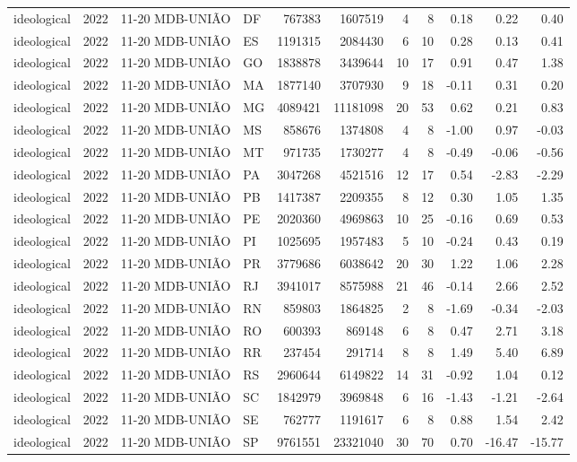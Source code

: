 \begin{landscape}
\begin{longtable}{lllL{1.4cm}rrrrrrr}
ideological & 2022 & 11-20 MDB-UNIÃO & DF & 767383 & 1607519 & 4 & 8 & 0.18 & 0.22 & 0.40 \\
ideological & 2022 & 11-20 MDB-UNIÃO & ES & 1191315 & 2084430 & 6 & 10 & 0.28 & 0.13 & 0.41 \\
ideological & 2022 & 11-20 MDB-UNIÃO & GO & 1838878 & 3439644 & 10 & 17 & 0.91 & 0.47 & 1.38 \\
ideological & 2022 & 11-20 MDB-UNIÃO & MA & 1877140 & 3707930 & 9 & 18 & -0.11 & 0.31 & 0.20 \\
ideological & 2022 & 11-20 MDB-UNIÃO & MG & 4089421 & 11181098 & 20 & 53 & 0.62 & 0.21 & 0.83 \\
ideological & 2022 & 11-20 MDB-UNIÃO & MS & 858676 & 1374808 & 4 & 8 & -1.00 & 0.97 & -0.03 \\
ideological & 2022 & 11-20 MDB-UNIÃO & MT & 971735 & 1730277 & 4 & 8 & -0.49 & -0.06 & -0.56 \\
ideological & 2022 & 11-20 MDB-UNIÃO & PA & 3047268 & 4521516 & 12 & 17 & 0.54 & -2.83 & -2.29 \\
ideological & 2022 & 11-20 MDB-UNIÃO & PB & 1417387 & 2209355 & 8 & 12 & 0.30 & 1.05 & 1.35 \\
ideological & 2022 & 11-20 MDB-UNIÃO & PE & 2020360 & 4969863 & 10 & 25 & -0.16 & 0.69 & 0.53 \\
ideological & 2022 & 11-20 MDB-UNIÃO & PI & 1025695 & 1957483 & 5 & 10 & -0.24 & 0.43 & 0.19 \\
ideological & 2022 & 11-20 MDB-UNIÃO & PR & 3779686 & 6038642 & 20 & 30 & 1.22 & 1.06 & 2.28 \\
ideological & 2022 & 11-20 MDB-UNIÃO & RJ & 3941017 & 8575988 & 21 & 46 & -0.14 & 2.66 & 2.52 \\
ideological & 2022 & 11-20 MDB-UNIÃO & RN & 859803 & 1864825 & 2 & 8 & -1.69 & -0.34 & -2.03 \\
ideological & 2022 & 11-20 MDB-UNIÃO & RO & 600393 & 869148 & 6 & 8 & 0.47 & 2.71 & 3.18 \\
ideological & 2022 & 11-20 MDB-UNIÃO & RR & 237454 & 291714 & 8 & 8 & 1.49 & 5.40 & 6.89 \\
ideological & 2022 & 11-20 MDB-UNIÃO & RS & 2960644 & 6149822 & 14 & 31 & -0.92 & 1.04 & 0.12 \\
ideological & 2022 & 11-20 MDB-UNIÃO & SC & 1842979 & 3969848 & 6 & 16 & -1.43 & -1.21 & -2.64 \\
ideological & 2022 & 11-20 MDB-UNIÃO & SE & 762777 & 1191617 & 6 & 8 & 0.88 & 1.54 & 2.42 \\
ideological & 2022 & 11-20 MDB-UNIÃO & SP & 9761551 & 23321040 & 30 & 70 & 0.70 & -16.47 & -15.77 \\

\end{longtable}
\end{landscape}
